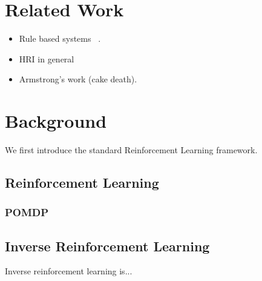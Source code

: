 \documentclass[11pt]{article}
\begin{document}


\section{Related Work}

\begin{itemize}
\item Rule based systems ~\cite{briggs2015sorry}. 
\item HRI in general~\cite{scheutz2007first,tellex2011understanding}
\item Armstrong's work (cake death).
\end{itemize}


\section{Background}

We first introduce the standard Reinforcement Learning framework.


\subsection{Reinforcement Learning}

\subsubsection{POMDP}

\subsection{Inverse Reinforcement Learning}

Inverse reinforcement learning is...


\end{document}
